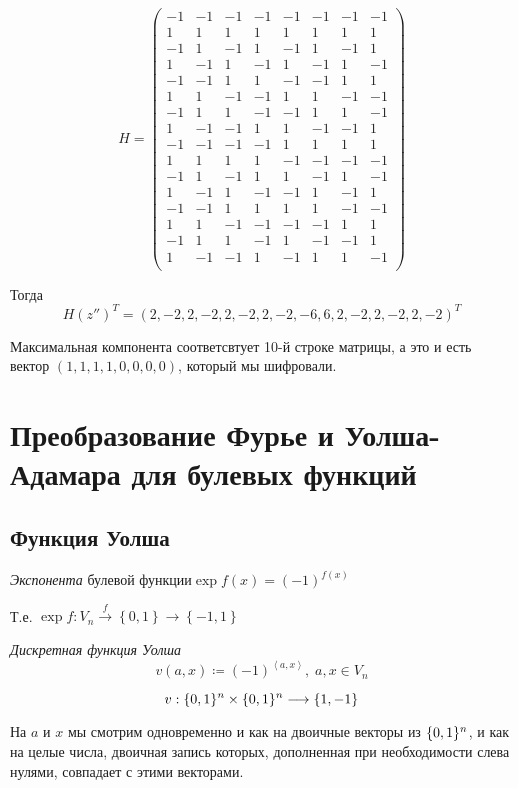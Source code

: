 $$H = \begin{pmatrix}
-1 & -1 & -1 & -1 & -1 & -1 & -1 & -1\\
1 & 1 & 1 & 1 & 1 & 1 & 1 & 1\\
-1 & 1 & -1 & 1 & -1 & 1 & -1 & 1\\
1 & -1 & 1 & -1 & 1 & -1 & 1 & -1\\
-1 & -1 & 1 & 1 & -1 & -1 & 1 & 1\\
1 & 1 & -1 & -1 & 1 & 1 & -1 & -1\\
-1 & 1 & 1 & -1 & -1 & 1 & 1 & -1\\
1 & -1 & -1
 & 1 & 1 & -1 & -1 & 1\\
-1 & -1 & -1 & -1 & 1 & 1 & 1 & 1\\
1 & 1 & 1 & 1 & -1 & -1 & -1 & -1\\
-1 & 1 & -1 & 1 & 1 & -1 & 1 & -1\\
1 & -1 & 1 & -1 & -1 & 1 & -1 & 1\\
-1 & -1 & 1 & 1 & 1 & 1 & -1 & -1\\
1 & 1 & -1 & -1 & -1 & -1 & 1 & 1\\
-1 & 1 & 1 & -1 & 1 & -1 & -1 & 1\\
1 & -1 & -1 & 1 & -1 & 1 & 1 & -1\\
\end{pmatrix}$$

Тогда
$$H (z'')^T = (2, -2, 2, -2, 2, -2, 2, -2, -6, 6, 2, -2, 2, -2, 2, -2)^T$$

Максимальная компонента соответсвтует 10-й строке матрицы, а это и есть вектор $(1,1,1,1,0,0,0,0)$,
который мы шифровали.


\section{Преобразование Фурье и Уолша-Адамара для булевых функций}
\subsection{Функция Уолша}
\begin{definition}
\emph{Экспонента }булевой функции$\exp f\left(x\right)=\left(-1\right)^{f\left(x\right)}$
\end{definition}
Т.е. $\exp f:V_{n}\stackrel{f}{\longrightarrow}\left\{ 0,1\right\} 
\longrightarrow\left\{ -1,1\right\} $


\begin{definition}
\emph{Дискретная функция Уолша}
\[
v\left(a,x\right)\coloneqq\left(-1\right)^{\left\langle a,x\right\rangle },\; a,x\in V_{n}
\]


\[
v:\{0,1\}^n\times \{0,1\}^n\longrightarrow\left\{ 1,-1\right\} 
\]

\end{definition}
На $a$ и $x$ мы смотрим одновременно и как на двоичные векторы из
$\{0,1\}^n$, и как на целые числа, двоичная запись которых, дополненная
при необходимости слева нулями, совпадает с этими векторами.



